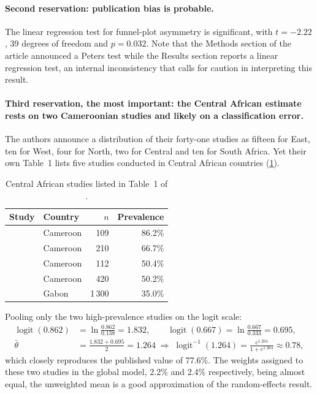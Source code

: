 \documentclass[12pt,a4paper,oneside]{report}
\begin{document}
\paragraph{Second reservation: publication bias is probable.} The linear regression test for funnel-plot asymmetry is significant, with $t=-2.22$, 39 degrees of freedom and $p=0.032$. Note that the Methods section of the article announced a Peters test while the Results section reports a linear regression test, an internal inconsistency that calls for caution in interpreting this result.

\paragraph{Third reservation, the most important: the Central African estimate rests on two Cameroonian studies and likely on a classification error.} The authors announce a distribution of their forty-one studies as fifteen for East, ten for West, four for North, two for Central and ten for South Africa. Yet their own Table~1 lists five studies conducted in Central African countries (\cref{tab:central-studies}).

\begin{table}[htbp]
\centering\small
\caption{Central African studies listed in Table~1 of \textcite{hinneh2023}.}\label{tab:central-studies}
\begin{tabular}{@{}llrr@{}}
\toprule
\textbf{Study} & \textbf{Country} & \textbf{$n$} & \textbf{Prevalence} \\
\midrule
\textcite{kemche2020} & Cameroon & 109 & 86.2\% \\
\textcite{choukem2007} & Cameroon & 210 & 66.7\% \\
\textcite{mfeukeu2022} & Cameroon & 112 & 50.4\% \\
\textcite{dzudie2012} & Cameroon & 420 & 50.2\% \\
\textcite{ovono2011} & Gabon & 1\,300 & 35.0\% \\
\bottomrule
\end{tabular}
\end{table}

Pooling only the two high-prevalence studies on the logit scale:
\begin{align}
  \operatorname{logit}(0.862) &= \ln\frac{0.862}{0.138} = 1.832, \qquad
  \operatorname{logit}(0.667) = \ln\frac{0.667}{0.333} = 0.695,\\
  \bar\theta &= \frac{1.832+0.695}{2} = 1.264 \;\Rightarrow\;
  \operatorname{logit}^{-1}(1.264) = \frac{e^{1.264}}{1+e^{1.264}} \approx 0.78,
\end{align}
which closely reproduces the published value of 77.6\%. The weights assigned to these two studies in the global model, 2.2\% and 2.4\% respectively, being almost equal, the unweighted mean is a good approximation of the random-effects result.
\end{document}
